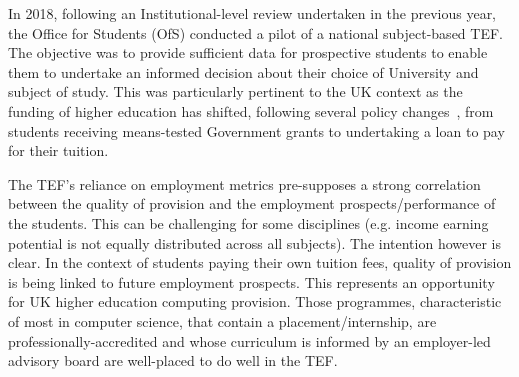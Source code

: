 \documentclass[conference]{IEEEtran}
\begin{document}
In 2018, following an Institutional-level review undertaken in the
previous year, the Office for Students (OfS) conducted a pilot of a
national subject-based TEF. The objective was to provide sufficient
data for prospective students to enable them to undertake an informed
decision about their choice of University and subject of study. This
was particularly pertinent to the UK context as the funding of higher
education has shifted, following several policy
changes~\cite{BIS2010a}, from students receiving means-tested
Government grants to undertaking a loan to pay for their tuition.


The TEF's reliance on employment metrics pre-supposes a strong
correlation between the quality of provision and the employment
prospects/performance of the students. This can be challenging for
some disciplines (e.g. income earning potential is not equally
distributed across all subjects). The intention however is clear. In
the context of students paying their own tuition fees, quality of
provision is being linked to future employment prospects. This
represents an opportunity for UK higher education computing provision. Those
programmes, characteristic of most in computer science, that contain a
placement/internship, are professionally-accredited and whose
curriculum is informed by an employer-led advisory board are
well-placed to do well in the TEF.
\end{document}

